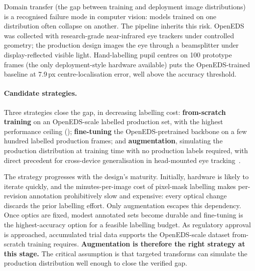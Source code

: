 Domain transfer (the gap between training and deployment image distributions) is a recognised failure mode in computer vision: models trained on one distribution often collapse on another. The pipeline inherits this risk. OpenEDS was collected with research-grade near-infrared eye trackers under controlled geometry; the production design images the eye through a beamsplitter under display-reflected visible light. Hand-labelling pupil centres on 100 prototype frames (the only deployment-style hardware available) puts the OpenEDS-trained baseline at 7.9\,px centre-localisation error, well above the accuracy threshold.

\paragraph{Candidate strategies.} Three strategies close the gap, in decreasing labelling cost: \textbf{from-scratch training} on an OpenEDS-scale labelled production set, with the highest performance ceiling (); \textbf{fine-tuning} the OpenEDS-pretrained backbone on a few hundred labelled production frames; and \textbf{augmentation}, simulating the production distribution at training time with no production labels required, with direct precedent for cross-device generalisation in head-mounted eye tracking~\cite{kothari2022ellseggen}.

The strategy progresses with the design's maturity. Initially, hardware is likely to iterate quickly, and the minutes-per-image cost of pixel-mask labelling makes per-revision annotation prohibitively slow and expensive: every optical change discards the prior labelling effort. Only augmentation escapes this dependency. Once optics are fixed, modest annotated sets become durable and fine-tuning is the highest-accuracy option for a feasible labelling budget. As regulatory approval is approached, accumulated trial data supports the OpenEDS-scale dataset from-scratch training requires. \textbf{Augmentation is therefore the right strategy at this stage.} The critical assumption is that targeted transforms can simulate the production distribution well enough to close the verified gap.

